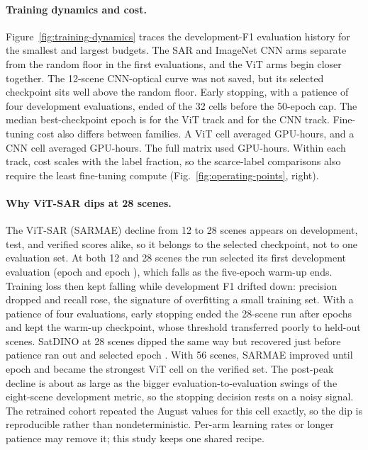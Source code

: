 \paragraph{Training dynamics and cost.}
Figure~\ref{fig:training-dynamics} traces the development-F1 evaluation
history for the smallest and largest budgets. The SAR and ImageNet CNN arms
separate from the random floor in the first evaluations, and the ViT arms
begin closer together. The 12-scene CNN-optical curve was not saved, but its
selected checkpoint sits well above the random floor. Early
stopping, with a patience of four development evaluations, ended
\HevCellsEarlyStopped{} of the 32 cells before the 50-epoch cap. The median
best-checkpoint epoch is \HevMedianBestEpochViT{} for the ViT track and
\HevMedianBestEpochCNN{} for the CNN track. Fine-tuning cost also differs
between families. A ViT cell averaged \HevMeanCellHoursViT{} GPU-hours, and
a CNN cell averaged \HevMeanCellHoursCNN{} GPU-hours. The full matrix used
\HevGPUHours{} GPU-hours. Within each track, cost scales with the label
fraction, so the scarce-label comparisons also require the least
fine-tuning compute (Fig.~\ref{fig:operating-points}, right).

\paragraph{Why ViT-SAR dips at 28 scenes.}
The ViT-SAR (SARMAE) decline from 12 to 28 scenes appears on development,
test, and verified scores alike, so it belongs to the selected checkpoint,
not to one evaluation set. At both 12 and 28 scenes the run selected its
first development evaluation (epoch \HevEpochViTSarTen{} and epoch
\HevEpochViTSarTwentyFive), which falls as the five-epoch warm-up ends.
Training loss then kept falling while development F1 drifted down:
precision dropped and recall rose, the signature of overfitting a small
training set. With a patience of four evaluations, early stopping ended the
28-scene run after \HevEpochsRunViTSarTwentyFive{} epochs and kept the
warm-up checkpoint, whose threshold transferred poorly to held-out scenes.
SatDINO at 28 scenes dipped the same way but recovered just before patience
ran out and selected epoch \HevEpochViTOpticalTwentyFive. With 56 scenes,
SARMAE improved until epoch \HevEpochViTSarFifty{} and became the strongest
ViT cell on the verified set. The post-peak decline is about as large as
the bigger evaluation-to-evaluation swings of the eight-scene development
metric, so the stopping decision rests on a noisy signal. The retrained
cohort repeated the August values for this cell exactly, so the dip is
reproducible rather than nondeterministic.
Per-arm learning rates or longer patience may remove it; this study keeps
one shared recipe.


